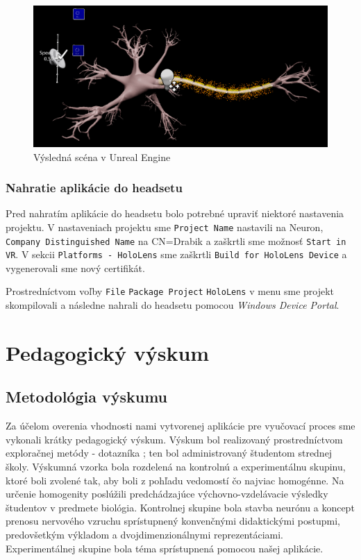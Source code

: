 \begin{figure}[!htbp]
  \centering
  \includegraphics[width=13cm]{img/scena.png}
  \caption{Výsledná scéna v Unreal Engine}
  \label{scena}
\end{figure}

\subsubsection{Nahratie aplikácie do headsetu}
Pred nahratím aplikácie do headsetu bolo potrebné upraviť niektoré nastavenia projektu. V nastaveniach projektu sme \texttt{Project Name} nastavili na Neuron, \texttt{Company Distinguished Name} na CN=Drabik a zaškrtli sme 
možnosť \texttt{Start in VR}. V sekcii \texttt{Platforms - HoloLens} sme zaškrtli \texttt{Build for HoloLens Device} a vygenerovali sme nový certifikát.

Prostredníctvom voľby \texttt{File} \to {} \texttt{Package Project} \to {} \texttt{HoloLens} v menu sme projekt skompilovali a následne nahrali do headsetu pomocou \emph{Windows Device Portal}.

\section{Pedagogický výskum}
\subsection{Metodológia výskumu}
Za účelom overenia vhodnosti nami vytvorenej aplikácie pre vyučovací proces sme vykonali krátky pedagogický výskum. Výskum bol realizovaný prostredníctvom exploračnej metódy - 
dotazníka \cite{svecMetodologieVedVychove2009}; ten bol administrovaný študentom strednej školy. Výskumná vzorka bola rozdelená na kontrolnú a experimentálnu skupinu, ktoré boli zvolené tak, aby boli z pohľadu vedomostí čo 
najviac homogénne. Na určenie homogenity poslúžili predchádzajúce výchovno-vzdelávacie výsledky študentov v predmete biológia. Kontrolnej skupine bola stavba neurónu a koncept prenosu nervového vzruchu sprístupnený
konvenčnými didaktickými postupmi, predovšetkým výkladom a dvojdimenzionálnymi reprezentáciami. Experimentálnej skupine bola téma sprístupnená pomocou našej aplikácie.

